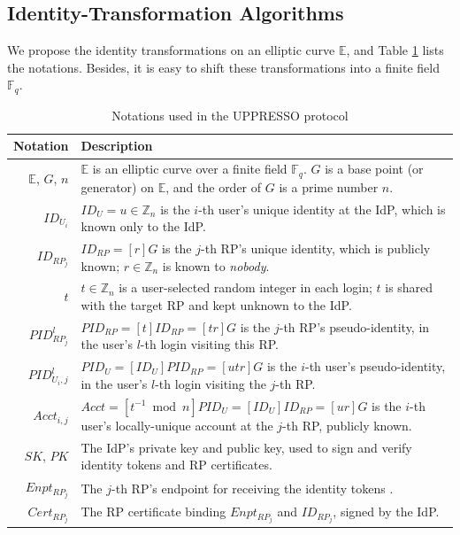 \subsection{Identity-Transformation Algorithms}
\label{subsec:overview}

We propose the identity transformations on an elliptic curve $\mathbb{E}$,
and Table \ref{tbl:notations-protocol} lists the notations.
Besides, it is easy to shift these transformations into a finite field $\mathbb{F}_q$.


\begin{table}[tb]
\footnotesize
    \caption{Notations used in the UPPRESSO protocol}
    \centering
    \begin{tabular}{|r|p{6.79cm}|} \hline
    {\textbf{Notation}} & {\textbf{Description}} \\ \hline
    {$\mathbb{E}$, $G$, $n$} & {$\mathbb{E}$ is an elliptic curve over a finite field $\mathbb{F}_q$. $G$ is a base point (or generator) on $\mathbb{E}$, and the order of $G$ is a prime number $n$.} \\ \hline
    {$ID_{U_i}$} & {$ID_U = u \in \mathbb{Z}_n$ is the $i$-th user's unique identity at the IdP, which is known only to the IdP.} \\ \hline
   {$ID_{RP_j}$} & {$ID_{RP} = [r]G$ is the $j$-th RP's unique identity, which is publicly known; $r \in \mathbb{Z}_n$ is known to \emph{nobody}.} \\ \hline
    {$t$} & {$t \in \mathbb{Z}_n$ is a user-selected random integer in each login; $t$ is shared with the target RP and kept unknown to the IdP.} \\ \hline
    {$PID_{RP_j}^l$} & {$PID_{RP} = [t]{ID_{RP}} = [tr]G$ is the $j$-th RP's pseudo-identity, in the user's $l$-th login visiting this RP.} \\ \hline
    {$PID_{U_i,j}^l$} & {$PID_U = [{ID_U}]{PID_{RP}} = [utr]G$ is the $i$-th user's pseudo-identity, in the user's $l$-th login visiting the $j$-th RP.} \\ \hline
     {$Acct_{i,j}$} & {$Acct = [t^{-1}\bmod n]PID_{U} = [ID_U]ID_{RP} = [ur]G$ is the $i$-th user's locally-unique account at the $j$-th RP, publicly known.} \\ \hline
    {$SK$, $PK$} & {The IdP's private key and public key, used to sign and verify identity tokens and RP certificates.} \\ \hline
    {$Enpt_{RP_j}$} & {The $j$-th RP's endpoint for receiving the identity tokens \cite{rfc6749}.} \\ \hline
    {$Cert_{RP_j}$} & {The RP certificate binding $Enpt_{RP_j}$ and $ID_{RP_j}$, signed by the IdP.} \\ \hline
    \end{tabular}
    \label{tbl:notations-protocol}
\end{table}

